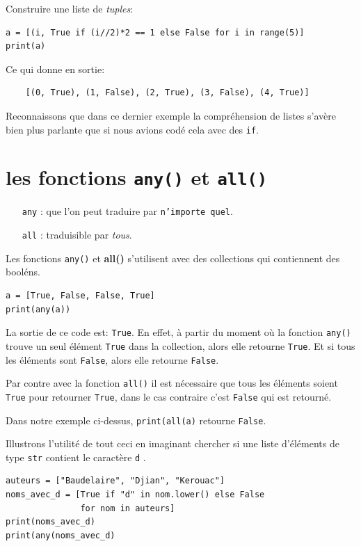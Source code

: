 \documentclass[a4paper,12pt]{book}
\begin{document}
Construire une liste de \textit{tuples}:
\begin{lstlisting}
a = [(i, True if (i//2)*2 == 1 else False for i in range(5)]
print(a)
\end{lstlisting}
\medskip

Ce qui donne en sortie:
\begin{verbatim}
    [(0, True), (1, False), (2, True), (3, False), (4, True)]
\end{verbatim}
\medskip

Reconnaissons que dans ce dernier exemple la compréhension de listes s'avère bien plus parlante que si nous avions codé cela avec des \texttt{if}.
\medskip

\section{les fonctions \texttt{any()} et \texttt{all()}}
\begin{itemize}
	\item[\texttt{any}]: que l'on peut traduire par \texttt{n'importe quel}.
	\item[\texttt{all}]: traduisible par \textit{tous}.
\end{itemize}
\medskip

Les fonctions \texttt{any()} et \textbf{all()} s'utilisent avec des collections qui contiennent des booléns.
\begin{lstlisting}
a = [True, False, False, True]
print(any(a))
\end{lstlisting}
\medskip

La sortie de ce code est: \texttt{True}. En effet, à partir du moment où la fonction \texttt{any()} trouve un seul élément \texttt{True} dans la collection, alors elle retourne \texttt{True}. Et si tous les éléments sont \texttt{False}, alors elle retourne \texttt{False}.
\medskip

Par contre avec la fonction \texttt{all()} il est nécessaire que tous les éléments soient \texttt{True} pour retourner \texttt{True}, dans le cas contraire c'est \texttt{False} qui est retourné.
\medskip

Dans notre exemple ci-dessus, \texttt{print(all(a)} retourne \texttt{False}.
\medskip

Illustrons l'utilité de tout ceci en imaginant chercher si une liste d'éléments de type \texttt{str} contient le caractère \og \texttt{d} \fg{}. 
\begin{lstlisting}
auteurs = ["Baudelaire", "Djian", "Kerouac"]
noms_avec_d = [True if "d" in nom.lower() else False 
               for nom in auteurs]
print(noms_avec_d)
print(any(noms_avec_d)
\end{lstlisting}
\medskip
\end{document}
